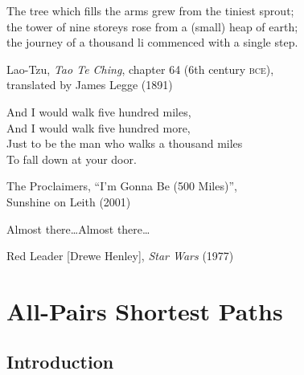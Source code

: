 \epigraph{The tree which fills the arms grew from the tiniest sprout;\\the tower of nine storeys rose from a (small) heap of earth;\\the journey of a thousand li commenced with a single step.}{Lao-Tzu, \textit{Tao Te Ching}, chapter 64 (6th century \textsc{bce}),\\translated by James Legge (1891)}

\epigraph{And I would walk five hundred miles,\\And I would walk five hundred more,\\Just to be the man who walks a thousand miles\\To fall down at your door.}{The Proclaimers, “I’m Gonna Be (500 Miles)”,\\Sunshine on Leith (2001)}

\epigraph{Almost there\dots Almost there\dots}{Red Leader [Drewe Henley], \textit{Star Wars} (1977)}

\chapter{All-Pairs Shortest Paths}
\label{ch:9}

\section{Introduction}
\label{sec:9.1}


